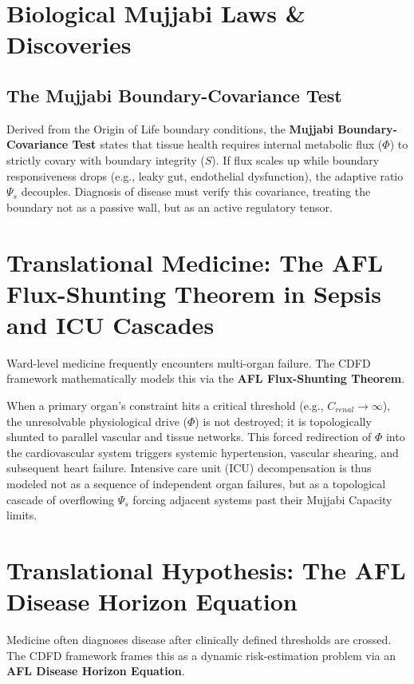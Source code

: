 \documentclass[11pt]{article}
\begin{document}
\section{Biological Mujjabi Laws \& Discoveries}

\subsection{The Mujjabi Boundary-Covariance Test \cite{MujjabiPartII2026}}
Derived from the Origin of Life boundary conditions, the \textbf{Mujjabi Boundary-Covariance Test \cite{MujjabiPartII2026}} states that tissue health requires internal metabolic flux ($\Phi$) to strictly covary with boundary integrity ($S$). If flux scales up while boundary responsiveness drops (e.g., leaky gut, endothelial dysfunction), the adaptive ratio $\Psi_s$ decouples. Diagnosis of disease must verify this covariance, treating the boundary not as a passive wall, but as an active regulatory tensor.



\section{Translational Medicine: The AFL Flux-Shunting Theorem in Sepsis and ICU Cascades}
Ward-level medicine frequently encounters multi-organ failure. The CDFD framework mathematically models this via the \textbf{AFL Flux-Shunting Theorem}. 

When a primary organ's constraint hits a critical threshold (e.g., $C_{renal} \to \infty$), the unresolvable physiological drive ($\Phi$) is not destroyed; it is topologically shunted to parallel vascular and tissue networks. This forced redirection of $\Phi$ into the cardiovascular system triggers systemic hypertension, vascular shearing, and subsequent heart failure. Intensive care unit (ICU) decompensation is thus modeled not as a sequence of independent organ failures, but as a topological cascade of overflowing $\Psi_s$ forcing adjacent systems past their Mujjabi Capacity limits.



\section{Translational Hypothesis: The AFL Disease Horizon Equation}
Medicine often diagnoses disease after clinically defined thresholds are crossed. The CDFD framework frames this as a dynamic risk-estimation problem via an \textbf{AFL Disease Horizon Equation}.
\end{document}
